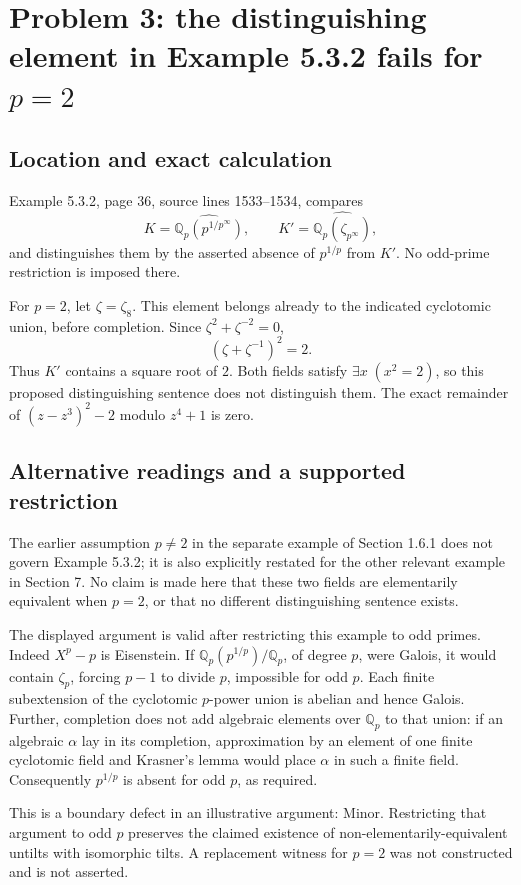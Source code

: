 \documentclass[10pt]{article}
\begin{document}
\section*{Problem 3: the distinguishing element in Example 5.3.2 fails for \(p=2\)}
\subsection*{Location and exact calculation}
Example 5.3.2, page 36, source lines 1533–1534, compares \[K=\widehat{\mathbb Q_p(p^{1/p^\infty})},
 \qquad
 K'=\widehat{\mathbb Q_p(\zeta_{p^\infty})},\] and distinguishes them by the asserted absence of \(p^{1/p}\) from \(K'\). No odd-prime restriction is imposed there.\par
For \(p=2\), let \(\zeta=\zeta_8\). This element belongs already to the indicated cyclotomic union, before completion. Since \(\zeta^2+\zeta^{-2}=0\), \[(\zeta+\zeta^{-1})^2=2.
 \tag{5.1}\] Thus \(K'\) contains a square root of \(2\). Both fields satisfy \(\exists x\;(x^2=2)\), so this proposed distinguishing sentence does not distinguish them. The exact remainder of \((z-z^3)^2-2\) modulo \(z^4+1\) is zero.\par
\subsection*{Alternative readings and a supported restriction}
The earlier assumption \(p\neq2\) in the separate example of Section 1.6.1 does not govern Example 5.3.2; it is also explicitly restated for the other relevant example in Section 7. No claim is made here that these two fields are elementarily equivalent when \(p=2\), or that no different distinguishing sentence exists.\par
The displayed argument is valid after restricting this example to odd primes. Indeed \(X^p-p\) is Eisenstein. If \(\mathbb Q_p(p^{1/p})/\mathbb Q_p\), of degree \(p\), were Galois, it would contain \(\zeta_p\), forcing \(p-1\) to divide \(p\), impossible for odd \(p\). Each finite subextension of the cyclotomic \(p\)-power union is abelian and hence Galois. Further, completion does not add algebraic elements over \(\mathbb Q_p\) to that union: if an algebraic \(\alpha\) lay in its completion, approximation by an element of one finite cyclotomic field and Krasner’s lemma would place \(\alpha\) in such a finite field. Consequently \(p^{1/p}\) is absent for odd \(p\), as required.\par
This is a boundary defect in an illustrative argument: Minor. Restricting that argument to odd \(p\) preserves the claimed existence of non-elementarily-equivalent untilts with isomorphic tilts. A replacement witness for \(p=2\) was not constructed and is not asserted.\par
\end{document}
